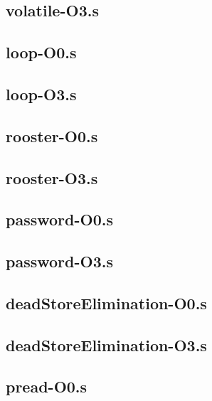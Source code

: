 \begin{appendices}
\subsection{volatile-O3.s}


\subsection{loop-O0.s}

\subsection{loop-O3.s}


\subsection{rooster-O0.s}

\subsection{rooster-O3.s}


\subsection{password-O0.s}

\subsection{password-O3.s}


\subsection{deadStoreElimination-O0.s}

\subsection{deadStoreElimination-O3.s}


\subsection{pread-O0.s}


\end{appendices}
